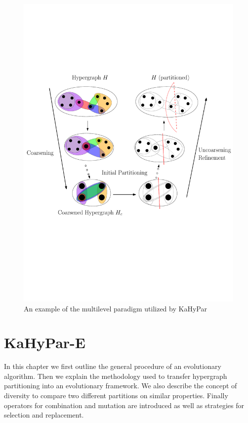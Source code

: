 \documentclass[a4paper,12pt,titlepage, BCOR7mm,headsepline]{scrbook}
\numberwithin{equation}{section}
\begin{document}
\begin{figure}[H]
    \vspace*{-.25cm}
  \centering
   \includegraphics[width=.8\textwidth]{Ipe/Memetic_process.pdf}
  \caption{An example of the multilevel paradigm utilized by KaHyPar}\label{fig:coarseningexample} %

\end{figure}



\chapter{KaHyPar-E}
\label{chapter:kahypare}
In this chapter we first outline the general procedure of an evolutionary algorithm. Then we explain the methodology used to transfer hypergraph partitioning into an evolutionary framework. We also describe the concept of diversity to compare two different partitions on similar properties. Finally operators for combination and mutation are introduced as well as strategies for selection and replacement.
\end{document}
